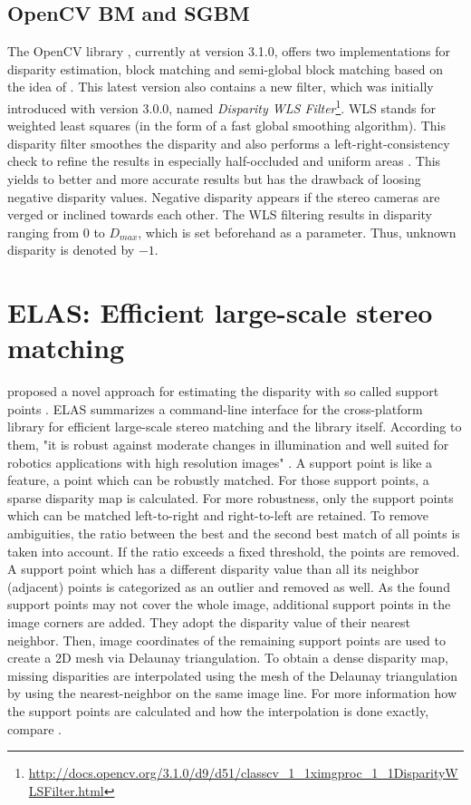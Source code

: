 \subsection*{OpenCV BM and SGBM}

The OpenCV library \citep{opencv_library}, currently at version 3.1.0, offers two implementations for disparity estimation, block matching and semi-global block matching based on the idea of \citeauthor{hirschmuller2005accurate}.
This latest version also contains a new filter, which was initially introduced with version 3.0.0, named \textit{Disparity WLS Filter}\footnote{\url{http://docs.opencv.org/3.1.0/d9/d51/classcv_1_1ximgproc_1_1DisparityWLSFilter.html}}.
WLS stands for weighted least squares (in the form of a fast global smoothing algorithm).
This disparity filter smoothes the disparity and also performs a left-right-consistency check to refine the results in especially half-occluded and uniform areas \citep{min2014fast}.
This yields to better and more accurate results but has the drawback of loosing negative disparity values.
Negative disparity appears if the stereo cameras are verged or inclined towards each other.
The WLS filtering results in disparity ranging from $0$ to $D_{max}$, which is set beforehand as a parameter.
Thus, unknown disparity is denoted by $-1$.

\section{ELAS: Efficient large-scale stereo matching}

\citeauthor{Geiger2010ACCV} proposed a novel approach for estimating the disparity with so called support points \citep{Geiger2010ACCV, Geiger2011IV}.
ELAS summarizes a command-line interface for the cross-platform library for efficient large-scale stereo matching and the library itself.
According to them, "it is robust against moderate changes in illumination and well suited for robotics applications with high resolution images" \citep{Geiger2010ACCV, Geiger2011IV}.
A support point is like a feature, a point which can be robustly matched.
For those support points, a sparse disparity map is calculated.
For more robustness, only the support points which can be matched left-to-right and right-to-left are retained.
To remove ambiguities, the ratio between the best and the second best match of all points is taken into account.
If the ratio exceeds a fixed threshold, the points are removed.
A support point which has a different disparity value than all its neighbor (adjacent) points is categorized as an outlier and removed as well.
As the found support points may not cover the whole image, additional support points in the image corners are added.
They adopt the disparity value of their nearest neighbor.
Then, image coordinates of the remaining support points are used to create a 2D mesh via Delaunay triangulation.
To obtain a dense disparity map, missing disparities are interpolated using the mesh of the Delaunay triangulation by using the nearest-neighbor on the same image line.
For more information how the support points are calculated and how the interpolation is done exactly, compare \citep{Geiger2010ACCV, Geiger2011IV}.

